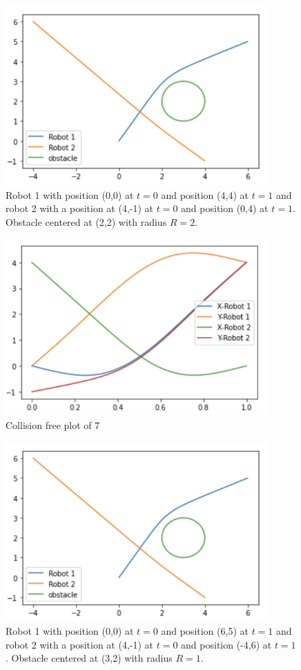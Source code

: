 \begin{figure}[H]
    \centering
    \includegraphics[width=10cm]{Graphs/2robots1obstacle.png}
    \caption{Robot 1 with position (0,0) at \( t = 0 \) and position (4,4) at \( t = 1 \) and robot 2 with a position at (4,-1) at \( t = 0 \) and position (0,4) at \( t = 1 \). Obstacle centered at (2,2) with radius \( R = 2 \).}
    \label{fig:my_label}
\end{figure}


\begin{figure}[H]
    \centering
    \includegraphics[width=10cm]{Graphs/collisionfree.png}
    \caption{Collision free plot of 7}
    \label{fig:my_label}
\end{figure}




\begin{figure}[H]
    \centering
    \includegraphics[width=10cm]{Graphs/2robots1obstacle.png}
    \caption{Robot 1 with position (0,0) at \( t = 0 \) and position (6,5) at \( t = 1 \) and robot 2 with a position at (4,-1) at \( t = 0 \) and position (-4,6) at \( t = 1 \). Obstacle centered at (3,2) with radius \( R = 1 \).}
    \label{fig:my_label}
\end{figure}






